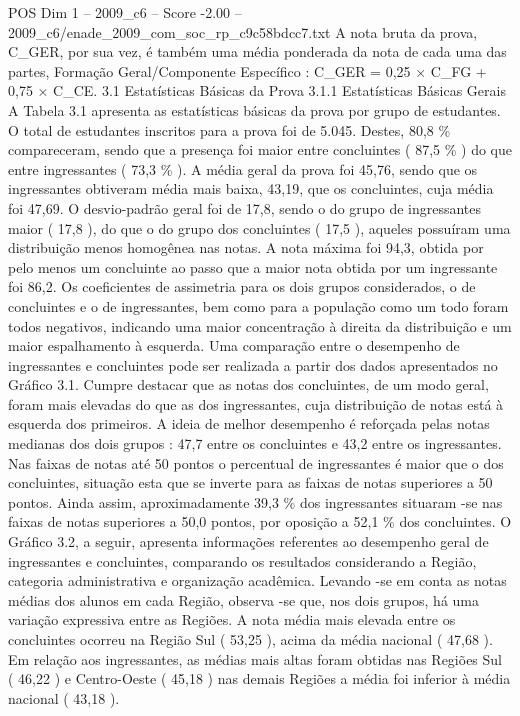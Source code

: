 \begin{textsample}{POS Dim 1 – 2009\_c6 – Score -2.00 – 2009\_c6/enade\_2009\_com\_soc\_rp\_c9c58bdcc7.txt}
A nota bruta da prova, C\_GER, por sua vez, é também uma média ponderada da nota de cada uma das partes, Formação Geral/Componente Específico : C\_GER = 0,25 × C\_FG + 0,75 × C\_CE. 3.1 Estatísticas Básicas da Prova 3.1.1 Estatísticas Básicas Gerais A Tabela 3.1 apresenta as estatísticas básicas da prova por grupo de estudantes.
O total de estudantes inscritos para a prova foi de 5.045.
Destes, 80,8 \% compareceram, sendo que a presença foi maior entre concluintes ( 87,5 \% ) do que entre ingressantes ( 73,3 \% ).
A média geral da prova foi 45,76, sendo que os ingressantes obtiveram média mais baixa, 43,19, que os concluintes, cuja média foi 47,69.
O desvio-padrão geral foi de 17,8, sendo o do grupo de ingressantes maior ( 17,8 ), do que o do grupo dos concluintes ( 17,5 ), aqueles possuíram uma distribuição menos homogênea nas notas.
A nota máxima foi 94,3, obtida por pelo menos um concluinte ao passo que a maior nota obtida por um ingressante foi 86,2.
Os coeficientes de assimetria para os dois grupos considerados, o de concluintes e o de ingressantes, bem como para a população como um todo foram todos negativos, indicando uma maior concentração à direita da distribuição e um maior espalhamento à esquerda.
Uma comparação entre o desempenho de ingressantes e concluintes pode ser realizada a partir dos dados apresentados no Gráfico 3.1.
Cumpre destacar que as notas dos concluintes, de um modo geral, foram mais elevadas do que as dos ingressantes, cuja distribuição de notas está à esquerda dos primeiros.
A ideia de melhor desempenho é reforçada pelas notas medianas dos dois grupos : 47,7 entre os concluintes e 43,2 entre os ingressantes.
Nas faixas de notas até 50 pontos o percentual de ingressantes é maior que o dos concluintes, situação esta que se inverte para as faixas de notas superiores a 50 pontos.
Ainda assim, aproximadamente 39,3 \% dos ingressantes situaram -se nas faixas de notas superiores a 50,0 pontos, por oposição a 52,1 \% dos concluintes.
O Gráfico 3.2, a seguir, apresenta informações referentes ao desempenho geral de ingressantes e concluintes, comparando os resultados considerando a Região, categoria administrativa e organização acadêmica.
Levando -se em conta as notas médias dos alunos em cada Região, observa -se que, nos dois grupos, há uma variação expressiva entre as Regiões.
A nota média mais elevada entre os concluintes ocorreu na Região Sul ( 53,25 ), acima da média nacional ( 47,68 ).
Em relação aos ingressantes, as médias mais altas foram obtidas nas Regiões Sul ( 46,22 ) e Centro-Oeste ( 45,18 ) nas demais Regiões a média foi inferior à média nacional ( 43,18 ).

\end{textsample}
